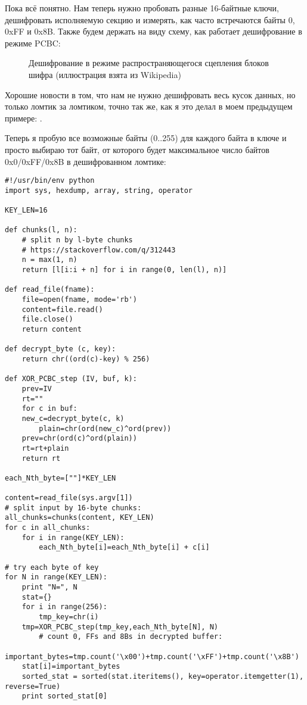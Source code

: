 Пока всё понятно. Нам теперь нужно пробовать разные 16-байтные ключи, дешифровать исполняемую секцию и измерять, как часто встречаются
байты 0, 0xFF и 0x8B.
Также будем держать на виду схему, как работает дешифрование в режиме PCBC:

\begin{figure}[H]
\centering
{}
\caption{Дешифрование в режиме распространяющегося сцепления блоков шифра (иллюстрация взята из Wikipedia)}
\end{figure}

Хорошие новости в том, что нам не нужно дешифровать весь кусок данных, но только ломтик за ломтиком, точно так же, как я это делал
в моем предыдущем примере: .

Теперь я пробую все возможные байты (0..255) для каждого байта в ключе и просто выбираю тот байт, от которого будет максимальное число
байтов 0x0/0xFF/0x8B в дешифрованном ломтике:

\begin{lstlisting}[style=custompy]
#!/usr/bin/env python
import sys, hexdump, array, string, operator

KEY_LEN=16

def chunks(l, n):
    # split n by l-byte chunks
    # https://stackoverflow.com/q/312443
    n = max(1, n)
    return [l[i:i + n] for i in range(0, len(l), n)]

def read_file(fname):
    file=open(fname, mode='rb')
    content=file.read()
    file.close()
    return content

def decrypt_byte (c, key):
    return chr((ord(c)-key) % 256)

def XOR_PCBC_step (IV, buf, k):
    prev=IV
    rt=""
    for c in buf:
	new_c=decrypt_byte(c, k)
        plain=chr(ord(new_c)^ord(prev))
	prev=chr(ord(c)^ord(plain))
	rt=rt+plain
    return rt

each_Nth_byte=[""]*KEY_LEN

content=read_file(sys.argv[1])
# split input by 16-byte chunks:
all_chunks=chunks(content, KEY_LEN)
for c in all_chunks:
    for i in range(KEY_LEN):
        each_Nth_byte[i]=each_Nth_byte[i] + c[i]

# try each byte of key
for N in range(KEY_LEN):
    print "N=", N
    stat={}
    for i in range(256):
        tmp_key=chr(i)
	tmp=XOR_PCBC_step(tmp_key,each_Nth_byte[N], N)
        # count 0, FFs and 8Bs in decrypted buffer:
	important_bytes=tmp.count('\x00')+tmp.count('\xFF')+tmp.count('\x8B')
	stat[i]=important_bytes
    sorted_stat = sorted(stat.iteritems(), key=operator.itemgetter(1), reverse=True)
    print sorted_stat[0]
\end{lstlisting}

